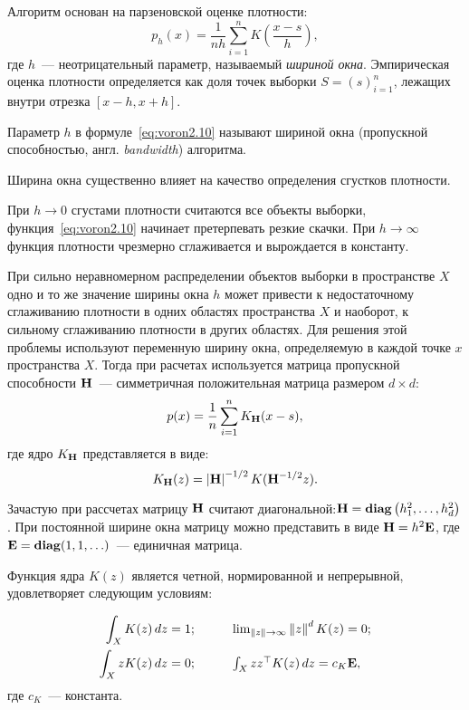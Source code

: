 Алгоритм основан на парзеновской оценке плотности:
\begin{equation}
    p_h(x) = \frac{1}{nh}\sum_{i=1}^n K\left(\frac{x - s}{h}\right),
    \label{eq:voron2.10}
\end{equation}
где \( h \)~--- неотрицательный параметр, называемый \emph{шириной окна}. Эмпирическая оценка плотности определяется как доля точек выборки \( S = (s)_{i=1}^n \), лежащих внутри отрезка \( [x - h, x + h] \).

Параметр \( h \) в формуле~\eqref{eq:voron2.10} называют шириной окна (пропускной способностью, англ. \emph{bandwidth}) алгоритма.

Ширина окна существенно влияет на качество определения сгустков плотности.

При \( h\to 0 \) сгустами плотности считаются все объекты выборки, функция~\eqref{eq:voron2.10} начинает претерпевать резкие скачки. При \( h\to\infty \) функция плотности чрезмерно сглаживается и вырождается в константу.

При сильно неравномерном распределении объектов выборки в пространстве \( X \) одно и то же значение ширины окна \( h \) может привести к недостаточному сглаживанию плотности в одних областях пространства \( X \) и наоборот, к сильному сглаживанию плотности в других областях. Для решения этой проблемы используют переменную ширину окна, определяемую в каждой точке \( x \) пространства \( X \). Тогда при расчетах используется матрица пропускной способности \( \mathbf{H} \)~--- симметричная положительная матрица размером \( d\times d\):
\begin{equation}
    p(x) = \frac{1}{n}\sum_{i=1}^n K_{\mathbf{H}}(x - s),
    \label{eq:msrobust1}
\end{equation}
где ядро \( K_{\mathbf{H}} \) представляется в виде:
\[
    K_{\mathbf{H}}(z) = \left|\mathbf{H}\right|^{-1/2} K(\mathbf{H}^{-1/2}z).
\]

Зачастую при рассчетах матрицу \( \mathbf{H} \) считают диагональной:\linebreak \( \mathbf{H} = \mathbf{diag}\left(h_1^2, \ldots, h_d^2\right) \). При постоянной ширине окна матрицу можно представить в виде \( \mathbf{H} = h^2\mathbf{E} \), где \( \mathbf{E} = \mathbf{diag}(1, 1, \ldots) \)~--- единичная матрица.

Функция ядра \( K(z) \) является четной, нормированной и непрерывной, удовлетворяет следующим условиям:

\[
    \begin{array}{rl}
    \displaystyle \int_X K(z)\,dz = 1; \qquad &
    \lim_{\left\|z\right\|\to\infty} \left\|z\right\|^d K(z) = 0; \\[1em]
    \displaystyle \int_X zK(z)\,dz = 0; \qquad &
    \int_X zz^\top K(z)\,dz = c_K\mathbf{E},
    \end{array}
\]
где \( c_K \)~--- константа.

